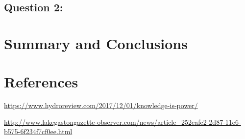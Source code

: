 \documentclass[12pt,]{article}
\begin{document}
\hypertarget{question-2}{%
\subsection{Question 2:}\label{question-2}}

\newpage

\hypertarget{summary-and-conclusions}{%
\section{Summary and Conclusions}\label{summary-and-conclusions}}

\newpage

\hypertarget{references}{%
\section{References}\label{references}}

\url{https://www.hydroreview.com/2017/12/01/knowledge-is-power/}

\url{http://www.lakegastongazette-observer.com/news/article_252eafe2-2d87-11e6-b575-6f234f7cf0ee.html}
\end{document}
